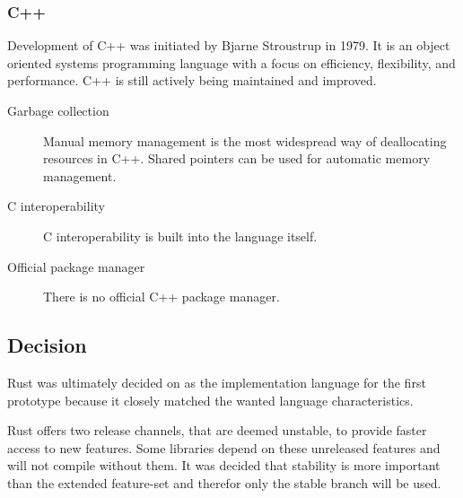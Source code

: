 \subsubsection{C++}
Development of C++ was initiated by Bjarne Stroustrup in 1979. It is an object oriented systems programming language with a focus on efficiency, flexibility, and performance. C++ is still actively being maintained and improved.
\begin{description} 
\item [Garbage collection] 
Manual memory management is the most widespread way of deallocating resources in C++. Shared pointers can be used for automatic memory management.
\item [C interoperability]
C interoperability is built into the language itself.
\item [Official package manager]
There is no official C++ package manager.  
\end{description}

\subsection{Decision}
Rust was ultimately decided on as the implementation language for the first prototype because it closely matched the wanted language characteristics.

Rust offers two release channels, that are deemed unstable, to provide faster access to new features. Some libraries depend on these unreleased features and will not compile without them. It was decided that stability is more important than the extended feature-set and therefor only the stable branch will be used.